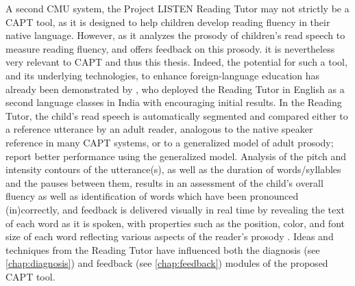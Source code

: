 	A second CMU system, the Project LISTEN Reading Tutor \citep{Mostow2012} 
may not strictly be a CAPT tool, as it 
is designed to help children develop reading fluency in their native language. 
However, as 
it analyzes the prosody of children's read speech to measure reading fluency, and offers feedback on this prosody. %
it is nevertheless very relevant to CAPT and thus this thesis. 
	Indeed, the potential for such a tool, and its underlying technologies, to enhance foreign-language education has already been demonstrated by 
	\textcite{Weber2010}, who deployed the Reading Tutor in English as a second language classes in India with encouraging initial results. 
	In the Reading Tutor, the child's read speech is automatically segmented and compared either to a reference utterance by an adult reader, analogous to the native speaker reference in many CAPT systems, or to a generalized model of adult prosody; \textcite{Duong2011} report better performance using the generalized model. Analysis of the pitch and intensity contours of the utterance(s), as well as the duration of words/syllables and the pauses between them, results in an assessment of the child's overall fluency as well as identification of words which have been pronounced (in)correctly, and feedback is delivered visually in real time by revealing the text of each word as it is spoken, with properties such as the position, color, and font size of each word reflecting various aspects of the reader's prosody \citep{Sitaram2011}. Ideas and techniques from the Reading Tutor have influenced both the diagnosis (see \cref{chap:diagnosis}) and feedback (see \cref{chap:feedback}) modules of the proposed CAPT tool. 
	
